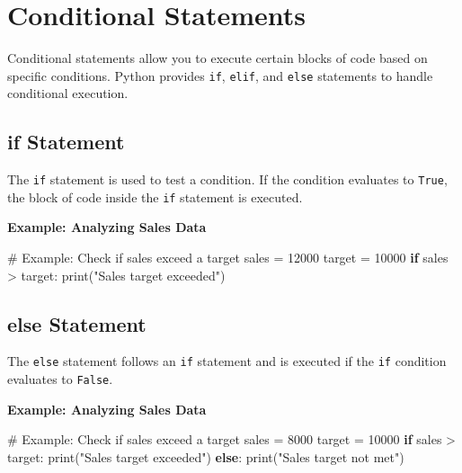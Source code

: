 \documentclass[
  letterpaper,
  DIV=11,
  numbers=noendperiod]{scrreprt}
\newenvironment{Shaded}{\begin{snugshade}}{\end{snugshade}}
\newcommand{\BuiltInTok}[1]{\textcolor[rgb]{0.00,0.23,0.31}{#1}}
\newcommand{\CommentTok}[1]{\textcolor[rgb]{0.37,0.37,0.37}{#1}}
\newcommand{\ControlFlowTok}[1]{\textcolor[rgb]{0.00,0.23,0.31}{\textbf{#1}}}
\newcommand{\DecValTok}[1]{\textcolor[rgb]{0.68,0.00,0.00}{#1}}
\newcommand{\NormalTok}[1]{\textcolor[rgb]{0.00,0.23,0.31}{#1}}
\newcommand{\OperatorTok}[1]{\textcolor[rgb]{0.37,0.37,0.37}{#1}}
\newcommand{\StringTok}[1]{\textcolor[rgb]{0.13,0.47,0.30}{#1}}
\begin{document}
\section{Conditional Statements}\label{conditional-statements-3}

Conditional statements allow you to execute certain blocks of code based
on specific conditions. Python provides \texttt{if}, \texttt{elif}, and
\texttt{else} statements to handle conditional execution.

\subsection{if Statement}\label{if-statement}

The \texttt{if} statement is used to test a condition. If the condition
evaluates to \texttt{True}, the block of code inside the \texttt{if}
statement is executed.

\textbf{Example: Analyzing Sales Data}

\begin{Shaded}
\begin{Highlighting}[]
\CommentTok{\# Example: Check if sales exceed a target}
\NormalTok{sales }\OperatorTok{=} \DecValTok{12000}
\NormalTok{target }\OperatorTok{=} \DecValTok{10000}
\ControlFlowTok{if}\NormalTok{ sales }\OperatorTok{\textgreater{}}\NormalTok{ target:}
    \BuiltInTok{print}\NormalTok{(}\StringTok{"Sales target exceeded"}\NormalTok{)}
\end{Highlighting}
\end{Shaded}

\subsection{else Statement}\label{else-statement}

The \texttt{else} statement follows an \texttt{if} statement and is
executed if the \texttt{if} condition evaluates to \texttt{False}.

\textbf{Example: Analyzing Sales Data}

\begin{Shaded}
\begin{Highlighting}[]
\CommentTok{\# Example: Check if sales exceed a target}
\NormalTok{sales }\OperatorTok{=} \DecValTok{8000}
\NormalTok{target }\OperatorTok{=} \DecValTok{10000}
\ControlFlowTok{if}\NormalTok{ sales }\OperatorTok{\textgreater{}}\NormalTok{ target:}
    \BuiltInTok{print}\NormalTok{(}\StringTok{"Sales target exceeded"}\NormalTok{)}
\ControlFlowTok{else}\NormalTok{:}
    \BuiltInTok{print}\NormalTok{(}\StringTok{"Sales target not met"}\NormalTok{)}
\end{Highlighting}
\end{Shaded}
\end{document}
